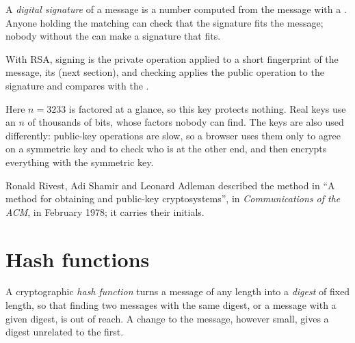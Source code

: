 \begin{definition}\label{def:g12:secure-communication:signature}
A \emph{digital signature} of a message is a number computed from the message with a . Anyone holding the matching  can check that the signature fits the message; nobody without the  can make a signature that fits.
\end{definition}

With RSA, signing is the private operation applied to a short fingerprint of the message, its  (next section),
and checking applies the public operation to the signature and compares with the .

\label{lst:g12:secure-communication:rsa}

\label{out:g12:secure-communication:rsa}

Here $n = 3233$ is factored at a glance, so this key protects nothing. Real keys use an $n$ of thousands of bits, whose
factors nobody can find. The keys are also used differently: public-key operations are slow, so a browser uses them
only to agree on a symmetric key and to check who is at the other end, and then encrypts everything with the
symmetric key.

\begin{history}
Ronald Rivest, Adi Shamir and Leonard Adleman described the method in ``A method for obtaining  and
public-key cryptosystems'', in \emph{Communications of the ACM}, in February 1978; it carries their initials.
\end{history}

\section{Hash functions}\label{sec:g12:secure-communication:hash}

\begin{definition}\label{def:g12:secure-communication:hash}
A cryptographic \emph{hash function} turns a message of any length into a \emph{digest}
of fixed length, so that finding two messages with the same digest, or a message with a given digest, is out of reach.
A change to the message, however small, gives a digest unrelated to the first.
\end{definition}

